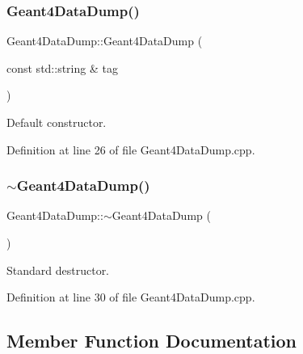 \subsubsection{\texorpdfstring{Geant4\+Data\+Dump()}{Geant4DataDump()}}
{\footnotesize\ttfamily Geant4\+Data\+Dump\+::\+Geant4\+Data\+Dump (\begin{DoxyParamCaption}\item[{const std\+::string \&}]{tag }\end{DoxyParamCaption})}



Default constructor. 



Definition at line 26 of file Geant4\+Data\+Dump.\+cpp.

\hypertarget{class_d_d4hep_1_1_simulation_1_1_geant4_data_dump_af966fda61c5237ac2858834cdeb1e238}{}\label{class_d_d4hep_1_1_simulation_1_1_geant4_data_dump_af966fda61c5237ac2858834cdeb1e238} 
\subsubsection{\texorpdfstring{$\sim$\+Geant4\+Data\+Dump()}{~Geant4DataDump()}}
{\footnotesize\ttfamily Geant4\+Data\+Dump\+::$\sim$\+Geant4\+Data\+Dump (\begin{DoxyParamCaption}{ }\end{DoxyParamCaption})\hspace{0.3cm}{\ttfamily [virtual]}}



Standard destructor. 



Definition at line 30 of file Geant4\+Data\+Dump.\+cpp.



\subsection{Member Function Documentation}
\hypertarget{class_d_d4hep_1_1_simulation_1_1_geant4_data_dump_ab563bcb9592305e9ee151f1b01306bd2}{}\label{class_d_d4hep_1_1_simulation_1_1_geant4_data_dump_ab563bcb9592305e9ee151f1b01306bd2} 
